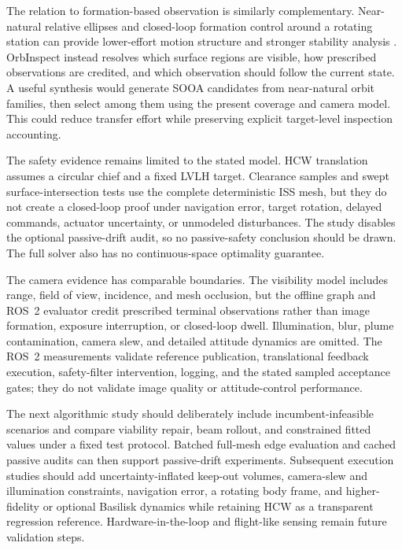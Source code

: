 \documentclass{IEEEtaes}
\theoremstyle{remark}
\theoremstyle{plain}
\begin{document}
The relation to formation-based observation is similarly complementary. Near-natural relative ellipses and closed-loop formation control around a rotating station can provide lower-effort motion structure and stronger stability analysis \cite{zhou2026formation}. OrbInspect instead resolves which surface regions are visible, how prescribed observations are credited, and which observation should follow the current state. A useful synthesis would generate SOOA candidates from near-natural orbit families, then select among them using the present coverage and camera model. This could reduce transfer effort while preserving explicit target-level inspection accounting.

The safety evidence remains limited to the stated model. HCW translation assumes a circular chief and a fixed LVLH target. Clearance samples and swept surface-intersection tests use the complete deterministic ISS mesh, but they do not create a closed-loop proof under navigation error, target rotation, delayed commands, actuator uncertainty, or unmodeled disturbances. The study disables the optional passive-drift audit, so no passive-safety conclusion should be drawn. The full solver also has no continuous-space optimality guarantee.

The camera evidence has comparable boundaries. The visibility model includes range, field of view, incidence, and mesh occlusion, but the offline graph and ROS~2 evaluator credit prescribed terminal observations rather than image formation, exposure interruption, or closed-loop dwell. Illumination, blur, plume contamination, camera slew, and detailed attitude dynamics are omitted. The ROS~2 measurements validate reference publication, translational feedback execution, safety-filter intervention, logging, and the stated sampled acceptance gates; they do not validate image quality or attitude-control performance.

The next algorithmic study should deliberately include incumbent-infeasible scenarios and compare viability repair, beam rollout, and constrained fitted values under a fixed test protocol. Batched full-mesh edge evaluation and cached passive audits can then support passive-drift experiments. Subsequent execution studies should add uncertainty-inflated keep-out volumes, camera-slew and illumination constraints, navigation error, a rotating body frame, and higher-fidelity or optional Basilisk dynamics while retaining HCW as a transparent regression reference. Hardware-in-the-loop and flight-like sensing remain future validation steps.
\end{document}
